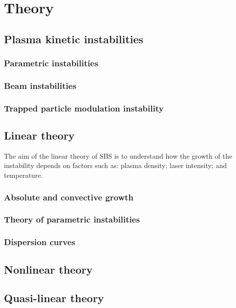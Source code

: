 \chapter{Theory}
\label{chp:theory}

\section{Plasma kinetic instabilities}
\subsection{Parametric instabilities}
\subsection{Beam instabilities}
\subsection{Trapped particle modulation instability}

\section{Linear theory}
The aim of the linear theory of \acrshort{SBS} is to understand how the growth of the instability depends on factors such as: plasma density; laser intensity; and temperature.
\subsection{Absolute and convective growth}
\subsection{Theory of parametric instabilities}
\subsection{Dispersion curves}

\section{Nonlinear theory}

\section{Quasi-linear theory}
